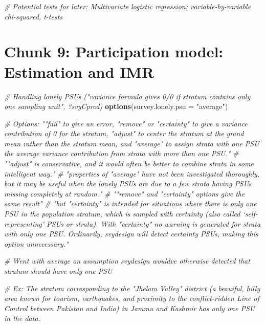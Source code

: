 \documentclass[
]{article}
\newenvironment{Shaded}{\begin{snugshade}}{\end{snugshade}}
\newcommand{\AttributeTok}[1]{\textcolor[rgb]{0.13,0.29,0.53}{#1}}
\newcommand{\CommentTok}[1]{\textcolor[rgb]{0.56,0.35,0.01}{\textit{#1}}}
\newcommand{\FunctionTok}[1]{\textcolor[rgb]{0.13,0.29,0.53}{\textbf{#1}}}
\newcommand{\NormalTok}[1]{#1}
\newcommand{\StringTok}[1]{\textcolor[rgb]{0.31,0.60,0.02}{#1}}
\begin{document}
\begin{Shaded}
\begin{Highlighting}[]
\CommentTok{\# Potential tests for later: Multivariate logistic regression; variable{-}by{-}variable chi{-}squared, t{-}tests}
\end{Highlighting}
\end{Shaded}

\section*{Chunk 9: Participation model: Estimation and IMR}\label{chunk-9-participation-model-estimation-and-imr}

\begin{Shaded}
\begin{Highlighting}[]
\CommentTok{\# Handling lonely PSUs ("variance formula  gives 0/0 if stratum contains only one sampling unit", \textasciigrave{}?svyCprod\textasciigrave{})}
\FunctionTok{options}\NormalTok{(}\AttributeTok{survey.lonely.psu =} \StringTok{"average"}\NormalTok{)}

\CommentTok{\# Options: ""fail" to give an error, "remove" or "certainty" to give a variance contribution of 0 for the stratum, "adjust" to center the stratum at the grand mean rather than the stratum mean, and "average" to assign strata with one PSU the average variance contribution from strata with more than one PSU."}
\CommentTok{\# ""adjust" is conservative, and it would often be better to combine strata in some intelligent way."}
\CommentTok{\# "properties of "average" have not been investigated thoroughly, but it may be useful when the lonely PSUs are due to a few strata having PSUs missing completely at random."}
\CommentTok{\# ""remove" and "certainty" options give the same result" }
\CommentTok{\# "but "certainty" is intended for situations where there is only one PSU in the population stratum, which is sampled with certainty (also called ‘self{-}representing’ PSUs or strata). With "certainty" no warning is generated for strata with only one PSU. Ordinarily, svydesign will detect certainty PSUs, making this option unnecessary."}

\CommentTok{\# Went with average on assumption svydesign would\textquotesingle{}ve otherwise detected that stratum should have only one PSU}

\CommentTok{\# Ex: The stratum corresponding to the "Jhelam Valley"  district (a beauiful, hilly area known for tourism, earthquakes, and proximity to the conflict{-}ridden Line of Control between Pakistan and India) in Jammu and Kashmir has only one PSU in the data.}



\end{Highlighting}
\end{Shaded}
\end{document}
